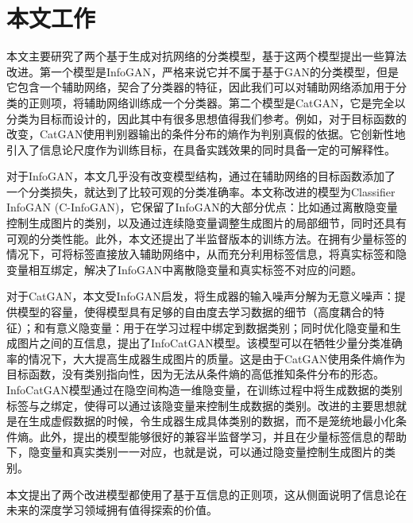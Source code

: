 \section{本文工作}
本文主要研究了两个基于生成对抗网络的分类模型，基于这两个模型提出一些算法改进。第一个模型是InfoGAN\cite{chen2016infogan}，严格来说它并不属于基于GAN的分类模型，但是它包含一个辅助网络，契合了分类器的特征，因此我们可以对辅助网络添加用于分类的正则项，将辅助网络训练成一个分类器。第二个模型是CatGAN\cite{springenberg2015unsupervised}，它是完全以分类为目标而设计的，因此其中有很多思想值得我们参考。例如，对于目标函数的改变，CatGAN使用判别器输出的条件分布的熵作为判别真假的依据。它创新性地引入了信息论尺度作为训练目标，在具备实践效果的同时具备一定的可解释性。

对于InfoGAN，本文几乎没有改变模型结构，通过在辅助网络的目标函数添加了一个分类损失，就达到了比较可观的分类准确率。本文称改进的模型为Classifier InfoGAN (C-InfoGAN)，它保留了InfoGAN的大部分优点：比如通过离散隐变量控制生成图片的类别，以及通过连续隐变量调整生成图片的局部细节，同时还具有可观的分类性能。此外，本文还提出了半监督版本的训练方法。在拥有少量标签的情况下，可将标签直接放入辅助网络中，从而充分利用标签信息，将真实标签和隐变量相互绑定，解决了InfoGAN中离散隐变量和真实标签不对应的问题。

对于CatGAN，本文受InfoGAN启发，将生成器的输入噪声分解为无意义噪声：提供模型的容量，使得模型具有足够的自由度去学习数据的细节（高度耦合的特征）；和有意义隐变量：用于在学习过程中绑定到数据类别；同时优化隐变量和生成图片之间的互信息，提出了InfoCatGAN模型。该模型可以在牺牲少量分类准确率的情况下，大大提高生成器生成图片的质量。这是由于CatGAN使用条件熵作为目标函数，没有类别指向性，因为无法从条件熵的高低推知条件分布的形态。InfoCatGAN模型通过在隐空间构造一维隐变量，在训练过程中将生成数据的类别标签与之绑定，使得可以通过该隐变量来控制生成数据的类别。改进的主要思想就是在生成虚假数据的时候，令生成器生成具体类别的数据，而不是笼统地最小化条件熵。此外，提出的模型能够很好的兼容半监督学习，并且在少量标签信息的帮助下，隐变量和真实类别一一对应，也就是说，可以通过隐变量控制生成图片的类别。

本文提出了两个改进模型都使用了基于互信息的正则项，这从侧面说明了信息论在未来的深度学习领域拥有值得探索的价值。

